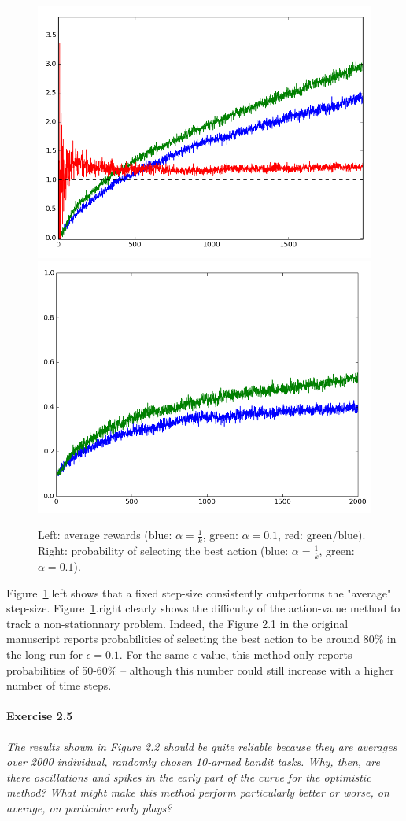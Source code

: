 \begin{figure}[!htb]
\centering
\includegraphics[width=0.47\columnwidth]{chap1_bandits/plot_rewards.png}
\includegraphics[width=0.47\columnwidth]{chap1_bandits/plot_bestaction.png}
\caption{\label{chap1_fig_ex24}
Left: average rewards (blue: $\alpha = \frac{1}{k}$, green: $\alpha = 0.1$, red: green/blue).
Right: probability of selecting the best action (blue: $\alpha = \frac{1}{k}$, green: $\alpha = 0.1$).
}
\end{figure}

Figure~\ref{chap1_fig_ex24}.left shows that a fixed step-size consistently outperforms the "average" step-size.
Figure~\ref{chap1_fig_ex24}.right clearly shows the difficulty of the action-value method to track a non-stationnary problem.
Indeed, the Figure 2.1 in the original manuscript reports probabilities of selecting the best action to be around 80\% in the long-run for $\epsilon = 0.1$.
For the same $\epsilon$ value, this method only reports probabilities of 50-60\% -- although this number could still increase with a higher number of time steps.


\paragraph{Exercise 2.5}
\textit{The results shown in Figure 2.2 should be quite reliable because they are averages over 2000 individual, randomly chosen 10-armed bandit tasks. Why, then, are there oscillations and spikes in the early part of the curve for the optimistic method? What might make this method perform particularly better or worse, on average, on particular early plays?}

